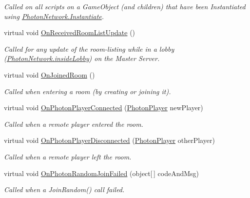 \begin{DoxyCompactItemize}
\begin{DoxyCompactList}\small\item\em Called on all scripts on a Game\+Object (and children) that have been Instantiated using \hyperlink{class_photon_network_a843d9f62d28ab123c83291c1e6bb857d}{Photon\+Network.\+Instantiate}. \end{DoxyCompactList}\item 
virtual void \hyperlink{class_photon_1_1_pun_behaviour_aa45db114fa51d09929389bf0620f3150}{On\+Received\+Room\+List\+Update} ()
\begin{DoxyCompactList}\small\item\em Called for any update of the room-\/listing while in a lobby (\hyperlink{class_photon_network_a8ad64b1a76c7918bbe5642639afff458}{Photon\+Network.\+inside\+Lobby}) on the Master Server. \end{DoxyCompactList}\item 
virtual void \hyperlink{class_photon_1_1_pun_behaviour_a8ee05dd443b9e51ddf962e655ca8ab77}{On\+Joined\+Room} ()
\begin{DoxyCompactList}\small\item\em Called when entering a room (by creating or joining it). \end{DoxyCompactList}\item 
virtual void \hyperlink{class_photon_1_1_pun_behaviour_abfe94f562c7abc261b25b0df95852a17}{On\+Photon\+Player\+Connected} (\hyperlink{class_photon_player}{Photon\+Player} new\+Player)
\begin{DoxyCompactList}\small\item\em Called when a remote player entered the room. \end{DoxyCompactList}\item 
virtual void \hyperlink{class_photon_1_1_pun_behaviour_af2f8ef712d9942f861f3357bb548e937}{On\+Photon\+Player\+Disconnected} (\hyperlink{class_photon_player}{Photon\+Player} other\+Player)
\begin{DoxyCompactList}\small\item\em Called when a remote player left the room. \end{DoxyCompactList}\item 
virtual void \hyperlink{class_photon_1_1_pun_behaviour_a94f901ce1a7af7b6c49937c5c47ceae4}{On\+Photon\+Random\+Join\+Failed} (object\mbox{[}$\,$\mbox{]} code\+And\+Msg)
\begin{DoxyCompactList}\small\item\em Called when a Join\+Random() call failed. \end{DoxyCompactList}\item 

\end{DoxyCompactItemize}
